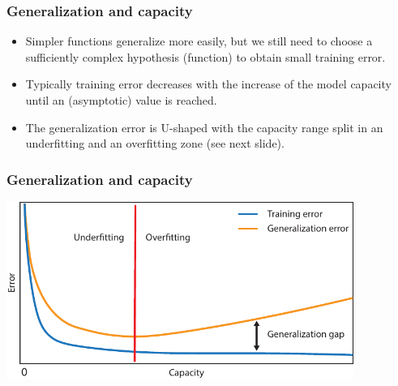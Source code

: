 \documentclass[notes]{beamer}          %
\newif\iffull
\begin{document}
\iffull
\begin{frame}
\frametitle{Overfitting and underfitting in polynomial estimation}
    \begin{itemize}
        \item Models with low capacity are not up to the task.
        \item Models with high-capacity can solve a complex task, but when the capacity is too high for the concrete (training) task there is the danger of overfitting.
        \item In our example: the linear function is unable to capture the curvature so it undefits.
        \item The degree-12 predictor is capable of fitting the training data, but it also able to find infinitely many functions that pass through the same points, so it ahs high probability of overfitting.
        \item The degree-4 function is the right solution and it generalizes well on the new data.
    \end{itemize}
\end{frame}
\fi

\begin{frame}
\frametitle{Generalization and capacity}
    \begin{itemize}
        \item Simpler functions generalize more easily, but we still need to choose a sufficiently complex hypothesis (function) to obtain small training error.
        \item Typically training error decreases with the increase of the model capacity until an (asymptotic) value is reached.
        \item The generalization error is U-shaped with the capacity range split in an underfitting and an overfitting zone (see next slide).
    \end{itemize}
\end{frame}


\begin{frame}
\frametitle{Generalization and capacity}
    \begin{center}
        \includegraphics[width=0.85\textwidth]{figures/week_2/generalization_gap.pdf}
    \end{center}
\end{frame}
\end{document}
